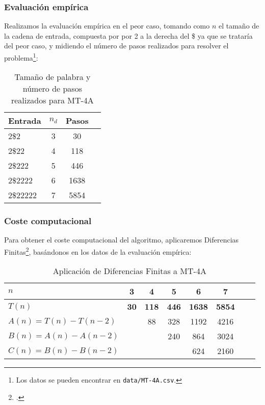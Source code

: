 \subsubsection*{Evaluación empírica}
Realizamos la evaluación empírica en el peor caso, tomando como $n$ el tamaño de la cadena de entrada, compuesta por por 2 a la derecha del \$ ya que se trataría del peor caso, y midiendo el número de pasos realizados para resolver el problema\footnote{Los datos se pueden encontrar en \texttt{data/MT-4A.csv}.}:

\begin{table}[H]
    \centering
    \begin{tabular}{lccc}
        Entrada & $n_d$ & Pasos \\
        \hline
        2\$2                     & 3  & 30   \\
        2\$22                    & 4  & 118   \\
        2\$222                   & 5  & 446  \\
        2\$2222                  & 6  & 1638  \\
        2\$22222                 & 7  & 5854  \\
    \end{tabular}
    \caption{Tamaño de palabra y número de pasos realizados para MT-4A}
\end{table}


\subsubsection*{Coste computacional}
Para obtener el coste computacional del algoritmo, aplicaremos Diferencias Finitas\footcite[ver][pgs. 1-42: \textit{Chapter 1. Difference Tables and Polynomial Fits}]{cuoco2005mathematical}, basándonos en los datos de la evaluación empírica:

\begin{table}[H]
    \centering
    \begin{tabular}{|l|c|c|c|c|c|c|c|}
        \hline
        $n$ & \textbf{3} & \textbf{4} & \textbf{5} & \textbf{6} & \textbf{7}\\ \hline
        $T(n)$ & \textbf{30} & \textbf{118} & \textbf{446} & \textbf{1638} & \textbf{5854}      \\ \hline
        \hline
        $A(n) = T(n) - T(n-2)$ &    & 88 & 328 & 1192 & 4216 \\ \hline
        $B(n) = A(n) - A(n-2)$ &    &   & 240 & 864 & 3024 \\ \hline
        $C(n) = B(n) - B(n-2)$ &    &   &    & 624 & 2160 \\ \hline
    \end{tabular}
    \caption{Aplicación de Diferencias Finitas a MT-4A}
\end{table}

